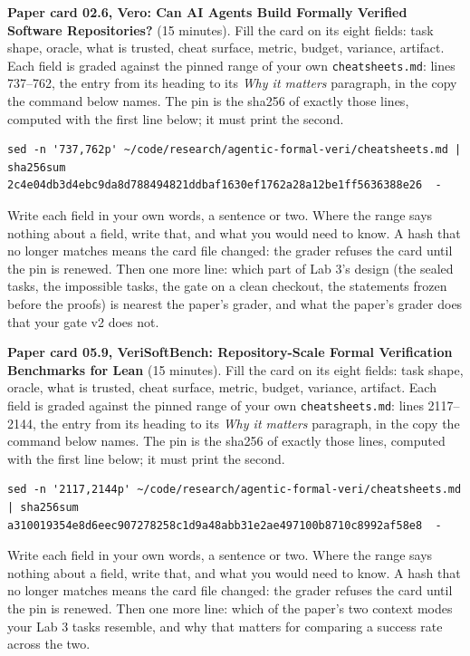 \documentclass[11pt]{article}
\begin{document}
\begin{problem}\label{prob:B4}
\textbf{Paper card 02.6, Vero: Can AI Agents Build Formally Verified Software Repositories?} (15 minutes). Fill the card on its eight
fields: task shape, oracle, what is trusted, cheat surface, metric, budget,
variance, artifact. Each field is graded against the pinned range of your own
\texttt{cheatsheets.md}: lines 737--762, the entry from its heading to its
\emph{Why it matters} paragraph, in the copy the command below names. The pin
is the sha256 of exactly those lines, computed with the first line below; it
must print the second.
{\small
\begin{verbatim}
sed -n '737,762p' ~/code/research/agentic-formal-veri/cheatsheets.md | sha256sum
2c4e04db3d4ebc9da8d788494821ddbaf1630ef1762a28a12be1ff5636388e26  -
\end{verbatim}
}
Write each field in your own words, a sentence or two. Where the range says
nothing about a field, write that, and what you would need to know. A hash
that no longer matches means the card file changed: the grader refuses the
card until the pin is renewed. Then one more line: which part of Lab 3's
design (the sealed tasks, the impossible tasks, the gate on a clean checkout,
the statements frozen before the proofs) is nearest the paper's grader, and
what the paper's grader does that your gate v2 does not.
\end{problem}

\begin{problem}\label{prob:B5}
\textbf{Paper card 05.9, VeriSoftBench: Repository-Scale Formal Verification Benchmarks for Lean} (15 minutes). Fill the card on its eight
fields: task shape, oracle, what is trusted, cheat surface, metric, budget,
variance, artifact. Each field is graded against the pinned range of your own
\texttt{cheatsheets.md}: lines 2117--2144, the entry from its heading to its
\emph{Why it matters} paragraph, in the copy the command below names. The pin
is the sha256 of exactly those lines, computed with the first line below; it
must print the second.
{\small
\begin{verbatim}
sed -n '2117,2144p' ~/code/research/agentic-formal-veri/cheatsheets.md | sha256sum
a310019354e8d6eec907278258c1d9a48abb31e2ae497100b8710c8992af58e8  -
\end{verbatim}
}
Write each field in your own words, a sentence or two. Where the range says
nothing about a field, write that, and what you would need to know. A hash
that no longer matches means the card file changed: the grader refuses the
card until the pin is renewed. Then one more line: which of the paper's two
context modes your Lab 3 tasks resemble, and why that matters for comparing
a success rate across the two.
\end{problem}
\end{document}
